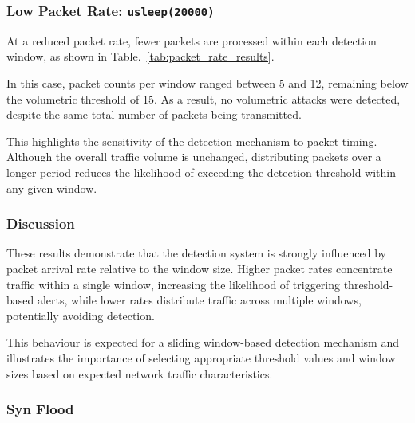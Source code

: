 \subsubsection{Low Packet Rate: \texttt{usleep(20000)}}
At a reduced packet rate, fewer packets are processed within each detection
window, as shown in Table.~\ref{tab:packet_rate_results}.

In this case, packet counts per window ranged between 5 and 12, remaining below
the volumetric threshold of 15. As a result, no volumetric attacks were
detected, despite the same total number of packets being transmitted.

This highlights the sensitivity of the detection mechanism to packet timing.
Although the overall traffic volume is unchanged, distributing packets over a
longer period reduces the likelihood of exceeding the detection threshold
within any given window.

\subsubsection{Discussion}
These results demonstrate that the detection system is strongly influenced by
packet arrival rate relative to the window size. Higher packet rates
concentrate traffic within a single window, increasing the likelihood of
triggering threshold-based alerts, while lower rates distribute traffic across
multiple windows, potentially avoiding detection.

This behaviour is expected for a sliding window-based detection mechanism and
illustrates the importance of selecting appropriate threshold values and window
sizes based on expected network traffic characteristics.

\subsubsection{Syn Flood}

\begin{table}[H]
    \centering
    \caption{Comparison of SYN flood detection for different SYN dataset sizes}
    \label{tab:syn_results}
\end{table}

